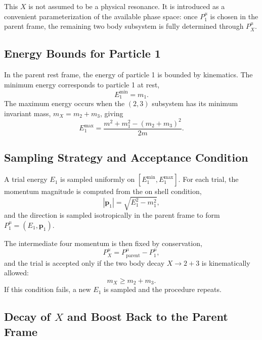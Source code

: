 \documentclass[11pt,a4paper]{article}
\newcommand{\p}{\mathbf{p}}
\begin{document}
This $X$ is not assumed to be a physical resonance. It is introduced as a convenient
parameterization of the available phase space: once $P_1^\mu$ is chosen in the parent
frame, the remaining two body subsystem is fully determined through $P_X^\mu$.

\subsection{Energy Bounds for Particle 1}

In the parent rest frame, the energy of particle 1 is bounded by kinematics. The minimum
energy corresponds to particle 1 at rest,
\begin{equation}
E_1^{\text{min}} = m_1 .
\end{equation}
The maximum energy occurs when the $(2,3)$ subsystem has its minimum invariant mass,
$m_X = m_2 + m_3$, giving
\begin{equation}
E_1^{\text{max}} =
\frac{m^2 + m_1^2 - (m_2 + m_3)^2}{2m} .
\end{equation}

\subsection{Sampling Strategy and Acceptance Condition}

A trial energy $E_1$ is sampled uniformly on $[E_1^{\text{min}}, E_1^{\text{max}}]$.
For each trial, the momentum magnitude is computed from the on shell condition,
\begin{equation}
|\p_1| = \sqrt{E_1^2 - m_1^2} ,
\end{equation}
and the direction is sampled isotropically in the parent frame to form
$P_1^\mu = (E_1, \p_1)$.

The intermediate four momentum is then fixed by conservation,
\begin{equation}
P_X^\mu = P_{\text{parent}}^\mu - P_1^\mu ,
\end{equation}
and the trial is accepted only if the two body decay $X \rightarrow 2 + 3$ is kinematically
allowed:
\begin{equation}
m_X \ge m_2 + m_3 .
\end{equation}
If this condition fails, a new $E_1$ is sampled and the procedure repeats.

\subsection{Decay of $X$ and Boost Back to the Parent Frame}
\end{document}
